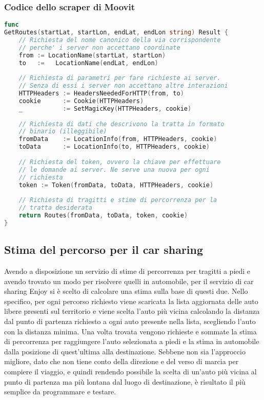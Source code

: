 \subsubsection{Codice dello scraper di Moovit}

\begin{lstlisting}[language=Go]
func
GetRoutes(startLat, startLon, endLat, endLon string) Result {
	// Richiesta del nome canonico della via corrispondente
	// perche' i server non accettano coordinate
	from := LocationName(startLat, startLon)
	to   :=   LocationName(endLat, endLon)
	
	// Richiesta di parametri per fare richieste ai server.
	// Senza di essi i server non accettano altre interazioni
	HTTPHeaders := HeadersNeededForHTTP(from, to)
	cookie      := Cookie(HTTPHeaders)
	_           := SetMagicKey(HTTPHeaders, cookie)
	
	// Richiesta di dati che descrivono la tratta in formato
	// binario (illeggibile)
	fromData    := LocationInfo(from, HTTPHeaders, cookie)
	toData      := LocationInfo(to, HTTPHeaders, cookie)
	
	// Richiesta del token, ovvero la chiave per effettuare
	// le domande ai server. Ne serve una nuova per ogni
	// richiesta
	token := Token(fromData, toData, HTTPHeaders, cookie)
	
	// Richiesta di tragitti e stime di percorrenza per la
	// tratta desiderata
	return Routes(fromData, toData, token, cookie)
}
\end{lstlisting}

\subsection{Stima del percorso per il car sharing}

Avendo a disposizione un servizio di stime di percorrenza per tragitti a piedi e avendo trovato un modo per risolvere quelli in automobile, per il servizio di car sharing Enjoy si è scelto di calcolare una stima sulla base di questi due. Nello specifico, per ogni percorso richiesto viene scaricata la lista aggiornata delle auto libere presenti sul territorio e viene scelta l'auto più vicina calcolando la distanza dal punto di partenza richiesto a ogni auto presente nella lista, scegliendo l'auto con la distanza minima. Una volta trovata vengono richieste e sommate la stima di percorrenza per raggiungere l'auto selezionata a piedi e la stima in automobile dalla posizione di quest'ultima alla destinazione. Sebbene non sia l'approccio migliore, dato che non tiene conto della direzione e del verso di marcia per compiere il viaggio, e quindi rendendo possibile la scelta di un'auto più vicina al punto di partenza ma più lontana dal luogo di destinazione, è risultato il più semplice da programmare e testare.

